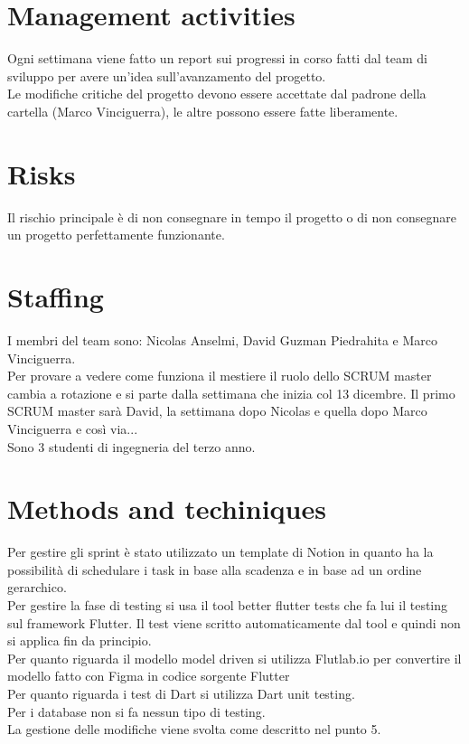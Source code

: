 \documentclass{article}
\begin{document}
\section{Management activities}
Ogni settimana viene fatto un report sui progressi in corso fatti dal team di sviluppo per avere un'idea sull'avanzamento del progetto.
\\Le modifiche critiche del progetto devono essere accettate dal padrone della cartella (Marco Vinciguerra), le altre possono essere fatte 
liberamente.
\section{Risks}
Il rischio principale è di non consegnare in tempo il progetto o di non consegnare un progetto perfettamente funzionante.
\section{Staffing}
I membri del team sono: Nicolas Anselmi, David Guzman Piedrahita e Marco Vinciguerra.
\\Per provare a vedere come funziona il mestiere il ruolo dello SCRUM master cambia a rotazione e si parte dalla settimana 
che inizia col 13 dicembre. Il primo SCRUM master sarà David, la settimana dopo Nicolas e quella dopo Marco Vinciguerra e così via...
\\Sono 3 studenti di ingegneria del terzo anno.

\section{Methods and techiniques}
Per gestire gli sprint è stato utilizzato un template di Notion in quanto ha la possibilità di schedulare i task in base alla scadenza e in base ad un ordine gerarchico.
\\Per gestire la fase di testing si usa il tool better flutter tests che fa lui il testing sul framework Flutter. Il test viene scritto automaticamente dal tool e quindi 
non si applica fin da principio.
\\Per quanto riguarda il modello model driven si utilizza Flutlab.io per convertire il modello fatto con Figma in codice sorgente Flutter
\\Per quanto riguarda i test di Dart si utilizza Dart unit testing.
\\Per i database non si fa nessun tipo di testing.
\\La gestione delle modifiche viene svolta come descritto nel punto 5.
\end{document}
